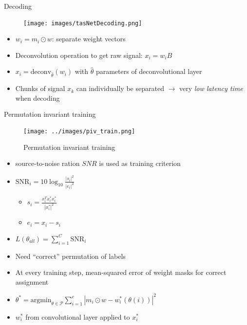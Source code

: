 \documentclass[xcolor=table,mathserif,9pt]{beamer}    %
\begin{document}
\begin{frame}{Decoding}

\begin{minipage}[t]{0.48\linewidth}
	\begin{figure}[htpb]
		\centering
		\texttt{[image: images/tasNetDecoding.png]}
	\end{figure}
\end{minipage}%
\hfill%
\begin{minipage}[t]{0.48\linewidth}
	\hfill
	\begin{itemize}
		\item $w_i = m_i \odot w$: separate weight vectors
		\item Deconvolution operation to get raw signal: $x_i = w_iB$ 
		\item $x_i = \text{deconv}_{\hat{\theta}}(w_i)$ with $\hat{\theta}$
			parameters of deconvolutional layer \cite{ler2010deconvolutional}
		\item Chunks of signal $x_k$ can individually be separated $\to$ 
		      very \emph{low latency time} when decoding
	\end{itemize}
\end{minipage}	

\end{frame}

\begin{frame}{Permutation invariant training \cite{7979557}}
\begin{minipage}[t]{0.48\linewidth}
\hfill
\begin{figure}[htpb]
	\centering
	\texttt{[image: ../images/piv\_train.png]}
	\caption{Permutation invariant training}
\end{figure}
\end{minipage}
\hfill
\begin{minipage}[t]{0.48\linewidth}
\begin{itemize}
	\item source-to-noise ration $SNR$ \cite{AudioSpeechLanguageProcessing} is used as training criterion
	\item $\text{SNR}_i  = 10\log_{10}\frac{|s_{i}|^2}{|e_{i}|^2}$
	\begin{itemize}
		\item $s_{i} = \frac{x_i^Tx_i^{*}x_i^{*}}{|x_i^{*}|^2}$
		\item $e_i = x_i - s_i$
	\end{itemize}
	\item \emph{$L(\theta_{all}) = \sum_{i=1}^C \text{SNR}_i$}
	\item Need ``correct'' permutation of labels  
	\item At every training step, mean-squared error of weight masks for correct assignment
	\item $ \theta^{*} = \text{argmin}_{\theta \in \mathcal{P}} \sum_{i=1}^{c} |m_i \odot w - w_i^{*}(\theta(i))|^2$ 
	\item $w_i^{*}$ from convolutional layer applied to $x_i^{*}$
\end{itemize}
\end{minipage}

\end{frame}
\end{document}
